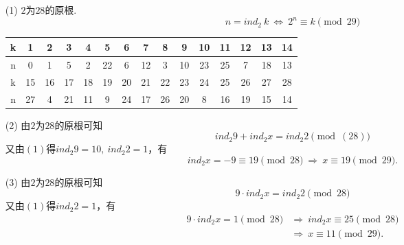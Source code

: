 \documentclass[UTF8]{ctexart}
\begin{document}
\subsection{}   %
\begin{enumerate}
    \item [(1)]$2$为$28$的原根.
    \[
        n = {ind}_{2}\  k\  \Leftrightarrow\  2^{n} \equiv k \pmod{29}
    \]
    \begin{table}[!ht]
        \centering
        \begin{tabular}{|c|c|c|c|c|c|c|c|c|c|c|c|c|c|c|}
        \hline
            k & 1 & 2 & 3 & 4 & 5 & 6 & 7 & 8 & 9 & 10 & 11 & 12 & 13 & 14  \\ \hline
            n & 0 & 1 & 5 & 2 & 22 & 6 & 12 & 3 & 10 & 23 & 25 & 7 & 18 & 13  \\ \hline
            k & 15 & 16 & 17 & 18 & 19 & 20 & 21 & 22 & 23 & 24 & 25 & 26 & 27 & 28  \\ \hline
            n & 27 & 4 & 21 & 11 & 9 & 24 & 17 & 26 & 20 & 8 & 16 & 19 & 15 & 14  \\ \hline
        \end{tabular}
    \end{table}
    
    \item [(2)]由$2$为$28$的原根可知
    \[
        {ind}_{2} 9 + {ind}_{2} x = {ind}_{2} 2 \pmod(28)    
    \]
    又由$(1)$得${ind}_{2} 9 = 10,\ {ind}_{2} 2=1$，有
    \[
        {ind}_{2} x = -9 \equiv 19 \pmod{28}    
        \ \Rightarrow\ 
        x\equiv 19 \pmod{29}.
    \]

    \item [(3)]由$2$为$28$的原根可知
    \[
        9\cdot {ind}_{2} x = {ind}_{2} 2 \pmod{28}
    \]
    又由$(1)$得${ind}_{2} 2=1$，有
    \begin{align*}
        9\cdot {ind}_{2} x = 1 \pmod{28}
        & \Rightarrow\ 
        {ind}_{2} x \equiv 25 \pmod{28}  \\
        & \Rightarrow\ 
        x \equiv 11 \pmod{29}.
    \end{align*}
\end{enumerate}
\end{document}
